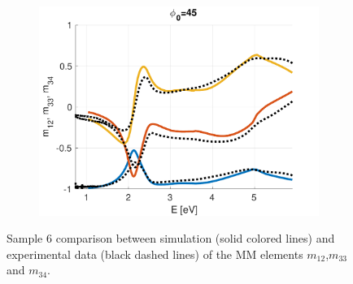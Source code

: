 \begin{figure}[h]
\begin{subfigure}{0.32\linewidth}
        \includegraphics[width=\linewidth, trim= 0cm 0cm 2cm 0cm, clip]{figures/ch4/S6/NCS/S6_NCS_phi45.pdf}
   \end{subfigure}
   \caption{Sample 6 comparison between simulation (solid colored lines) and experimental data (black dashed lines) of the MM elements $m_{12}$,$m_{33}$ and $m_{34}$.}
   \label{fig:S6_NCS}
\end{figure}
